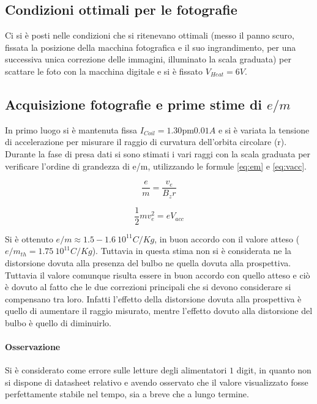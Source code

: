 \documentclass[10pt,a4paper]{article}
\begin{document}
\subsection{Condizioni ottimali per le fotografie}

Ci si è posti nelle condizioni che si ritenevano ottimali (messo il panno scuro, fissata la posizione della macchina fotografica e il suo ingrandimento, per una successiva unica correzione delle immagini, illuminato la scala graduata) per scattare le foto con la macchina digitale e si è fissato $V_{Heat} = \unit{6}{V}$.


\subsection{Acquisizione fotografie e prime stime di $e/m$}

In primo luogo si è mantenuta fissa $I_{Coil} = \unit{1.30 \pm 0.01}{A}$ e si è variata la tensione di accelerazione per misurare il raggio di curvatura dell'orbita circolare (r). Durante la fase di presa dati si sono stimati i vari raggi con la scala graduata per verificare l'ordine di grandezza di e/m, utilizzando le formule \eqref{eq:em} e \eqref{eq:vacc}. 

\begin{equation}
	\frac{e}{m} = \frac{v_e}{B_z r}
	\label{eq:em}
\end{equation}

\begin{equation}
\frac{1}{2} m v_e^2 = e V_{acc}
\label{eq:vacc}
\end{equation}

Si è ottenuto  $e/m \approx \unit{1.5-1.6~10^{11}}{C/Kg}$, in buon accordo con il valore atteso ($e/m_{th} = \unit{1.75~10^{11}}{C/Kg}$). Tuttavia in questa stima non si è considerata ne la distorsione dovuta alla presenza del bulbo ne quella dovuta alla prospettiva. Tuttavia il valore comunque risulta essere in buon accordo con quello atteso e ciò è dovuto al fatto che le due correzioni principali che si devono considerare si compensano tra loro. Infatti l'effetto della distorsione dovuta alla prospettiva è quello di aumentare il raggio misurato, mentre l'effetto dovuto alla distorsione del bulbo è quello di diminuirlo.


\paragraph{Osservazione} Si è considerato come errore sulle letture degli alimentatori $1$ digit, in quanto non si dispone di datasheet relativo e avendo osservato che il valore visualizzato fosse perfettamente stabile nel tempo, sia a breve che a lungo termine.
\end{document}
